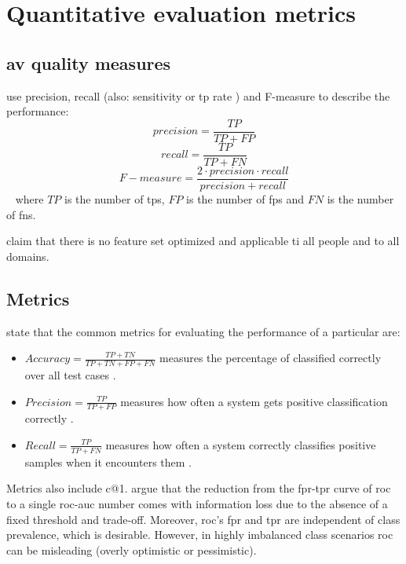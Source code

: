 \section{Quantitative evaluation metrics}

\subsection{\ac{av} quality measures}
\label{subsec:av_quality_measures}

\citet{chen_web_2008} use precision, recall (also: sensitivity or \acl{tp} rate \cite{palivela_optimization_2021}) 
and F-measure to describe the performance:
$$precision = \frac{TP}{TP + FP}$$
$$recall = \frac{TP}{TP + FN}$$
$$F-measure = \frac{2 \cdot precision \cdot recall}{precision + recall}$$~\cite{chen_web_2008,abbasi_writeprints_2008}
where $TP$ is the number of \aclp{tp}, $FP$ is the number of \aclp{fp} 
and $FN$ is the number of \aclp{fn}.

\citet{elmanarelbouanani_authorship_2014} claim that there is no feature set optimized and applicable ti all people and to all domains.

\subsection{Metrics}
\citet{elmanarelbouanani_authorship_2014} state that the common metrics for evaluating the performance of a particular are:
\begin{itemize}
    \item $Accuracy = \frac{TP + TN}{TP + TN + FP + FN}$ \cite{elmanarelbouanani_authorship_2014,neal_surveying_2018} 
    measures the percentage of classified correctly over all test cases \cite{neal_surveying_2018}.

    \item $Precision = \frac{TP}{TP + FP}$ \cite{elmanarelbouanani_authorship_2014,neal_surveying_2018} 
    measures how often a system gets positive classification correctly \cite{neal_surveying_2018}.

    \item $Recall = \frac{TP}{TP + FN}$ \cite{elmanarelbouanani_authorship_2014,neal_surveying_2018} 
    measures how often a system correctly classifies positive samples when it encounters them \cite{neal_surveying_2018}.
\end{itemize}

Metrics also include c@1.
\citet{llm_detection_av_2025} argue that the reduction from the \ac{fpr}-\ac{tpr} curve of \ac{roc} to a single \ac{roc-auc} number 
comes with information loss due to the absence of a fixed threshold and trade-off.
Moreover, \ac{roc}'s \ac{fpr} and \ac{tpr} are independent of class prevalence, which is desirable.
However, in highly imbalanced class scenarios \ac{roc} can be misleading (overly optimistic or pessimistic).

